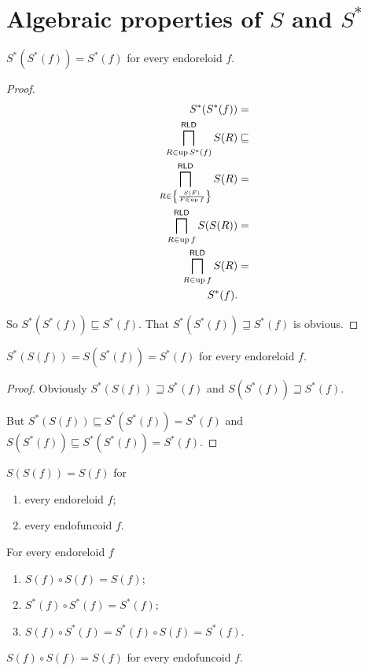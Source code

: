 \section{\texorpdfstring{Algebraic properties of $S$ and $S^{\ast}$}%
{Algebraic properties of S and S*}}
\begin{thm}
$S^{\ast}(S^{\ast}(f))=S^{\ast}(f)$ for every endoreloid $f$.\end{thm}
\begin{proof}
~
\begin{align*}
S^{\ast}(S^{\ast}(f)) & =\\
\bigsqcap_{R\in\operatorname{up} S^{\ast}(f)}^{\mathsf{RLD}}S(R) & \sqsubseteq\\
\bigsqcap_{R\in\left\{ \frac{S(F)}{F\in\operatorname{up} f}\right\}}^{\mathsf{RLD}}S(R) & =\\
\bigsqcap_{R\in\operatorname{up} f}^{\mathsf{RLD}}S(S(R)) & =\\
\bigsqcap_{R\in\operatorname{up} f}^{\mathsf{RLD}}S(R) & =\\
S^{\ast}(f).
\end{align*}


So $S^{\ast}(S^{\ast}(f))\sqsubseteq S^{\ast}(f)$. That $S^{\ast}(S^{\ast}(f))\sqsupseteq S^{\ast}(f)$
is obvious.\end{proof}
\begin{cor}
$S^{\ast}(S(f))=S(S^{\ast}(f))=S^{\ast}(f)$ for every endoreloid
$f$.\end{cor}
\begin{proof}
Obviously $S^{\ast}(S(f))\sqsupseteq S^{\ast}(f)$ and $S(S^{\ast}(f))\sqsupseteq S^{\ast}(f)$.

But $S^{\ast}(S(f))\sqsubseteq S^{\ast}(S^{\ast}(f))=S^{\ast}(f)$
and $S(S^{\ast}(f))\sqsubseteq S^{\ast}(S^{\ast}(f))=S^{\ast}(f)$.\end{proof}
\begin{conjecture}
$S(S(f))=S(f)$ for
\begin{enumerate}
\item every endoreloid $f$;
\item every endofuncoid $f$.
\end{enumerate}
\end{conjecture}

\begin{conjecture}
For every endoreloid $f$
\begin{enumerate}
\item $S(f)\circ S(f)=S(f)$;
\item $S^{\ast}(f)\circ S^{\ast}(f)=S^{\ast}(f)$;
\item $S(f)\circ S^{\ast}(f)=S^{\ast}(f)\circ S(f)=S^{\ast}(f)$.
\end{enumerate}
\end{conjecture}

\begin{conjecture}
$S(f)\circ S(f)=S(f)$ for every endofuncoid $f$.\end{conjecture}

